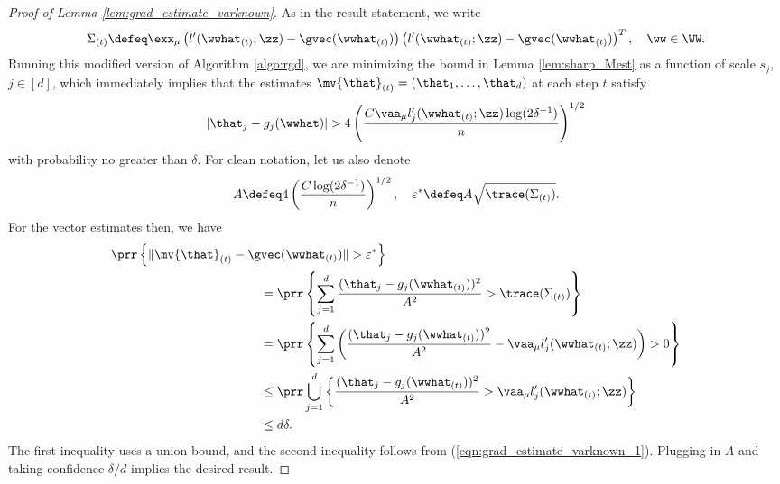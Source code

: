\documentclass[11pt,oneside]{article}
\theoremstyle{definition} \newtheorem{defn}{Definition}       %
\theoremstyle{plain} \newtheorem{prop}[defn]{Proposition}           %
\theoremstyle{plain} \newtheorem{thm}[defn]{Theorem}                %
\theoremstyle{plain} \newtheorem{lem}[defn]{Lemma}                  %
\theoremstyle{plain} \newtheorem{cor}[defn]{Corollary}              %
\theoremstyle{remark} \newtheorem{rmk}[defn]{Remark}                %
\theoremstyle{remark} \newtheorem{ex}[defn]{Example}                %
\begin{document}
\begin{proof}[Proof of Lemma \ref{lem:grad_estimate_varknown}]
As in the result statement, we write
%
\begin{align*}
\Sigma_{(t)} \defeq \exx_{\mu}\left(l^{\prime}(\wwhat_{(t)};\zz) - \gvec(\wwhat_{(t)})\right)\left(l^{\prime}(\wwhat_{(t)};\zz) - \gvec(\wwhat_{(t)})\right)^{T}, \quad \ww \in \WW.
\end{align*}
%
Running this modified version of Algorithm \ref{algo:rgd}, we are minimizing the bound in Lemma \ref{lem:sharp_Mest} as a function of scale $s_{j}$, $j \in [d]$, which immediately implies that the estimates $\mv{\that}_{(t)}=(\that_{1},\ldots,\that_{d})$ at each step $t$ satisfy
%
\begin{align}\label{eqn:grad_estimate_varknown_1}
|\that_{j} - g_{j}(\wwhat)| > 4 \left(\frac{C\vaa_{\mu}l^{\prime}_{j}(\wwhat_{(t)};\zz)\log(2\delta^{-1})}{n}\right)^{1/2}
\end{align}
%
with probability no greater than $\delta$. For clean notation, let us also denote
%
\begin{align*}
A \defeq 4 \left(\frac{C\log(2\delta^{-1})}{n} \right)^{1/2}, \quad \varepsilon^{\ast} \defeq A\sqrt{\trace(\Sigma_{(t)})}.
\end{align*}
%
For the vector estimates then, we have
%
\begin{align*}
\prr\left\{ \|\mv{\that}_{(t)}-\gvec(\wwhat_{(t)})\| > \varepsilon^{\ast} \right\} &\\
& \hspace{-3.5cm} = \prr\left\{ \sum_{j=1}^{d}\frac{(\that_{j} - g_{j}(\wwhat_{(t)}))^{2}}{A^{2}} > \trace(\Sigma_{(t)}) \right\}\\
& \hspace{-3.5cm} = \prr\left\{ \sum_{j=1}^{d}\left(\frac{(\that_{j} - g_{j}(\wwhat_{(t)}))^{2}}{A^{2}}-\vaa_{\mu}l_{j}^{\prime}(\wwhat_{(t)};\zz)\right) > 0 \right\}\\
& \hspace{-3.5cm} \leq \prr \bigcup_{j=1}^{d} \left\{ \frac{(\that_{j} - g_{j}(\wwhat_{(t)}))^{2}}{A^{2}} > \vaa_{\mu}l_{j}^{\prime}(\wwhat_{(t)};\zz) \right\}\\
& \hspace{-3.5cm} \leq d\delta.
\end{align*}
%
The first inequality uses a union bound, and the second inequality follows from (\ref{eqn:grad_estimate_varknown_1}). Plugging in $A$ and taking confidence $\delta/d$ implies the desired result.
\end{proof}
\end{document}
